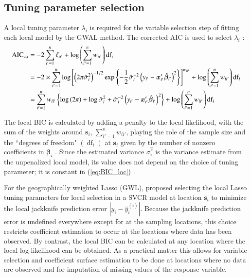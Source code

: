 \documentclass[authoryear, review, 11pt]{elsarticle}
\DeclareMathOperator*{\df}{\mbox{df}}
\begin{document}
	\subsection{Tuning parameter selection}	
	A local tuning parameter $\lambda_i$ is required for the variable selection step of fitting each local model by the GWAL method. The corrected AIC is used to select $\lambda_i$ \citep{Hurvich:1998}:
	\begin{align}\label{eq:BIC_loc}
		\mbox{AIC}_{\text{c}, i} &= -2 \sum_{i'=1}^n \ell_{ii'}  + \log \left( \sum_{i'=1}^n w_{ii'} \right) \mbox{df}_i\notag\\
		&= -2 \times \sum_{i'=1}^n \log \left[ \left(2 \pi \hat{\sigma}_i^2\right)^{-1/2} \exp \left\{-\frac{1}{2} \hat{\sigma}_i^{-2} \left(y_{i'} - \bm{x}_{i'}' \hat{\bm{\beta}}_{i'} \right)^2\right\} \right]^{w_{ii'}} + \log \left( \sum_{i'=1}^n w_{ii'} \right) \mbox{df}_i\notag\\
		&= \sum_{i'=1}^n w_{ii'} \left\{ \log \left(2 \pi \right) + \log \hat{\sigma}_i^2 + \hat{\sigma}_i^{-2} \left(y_{i'} - \bm{x}_{i'}' \hat{\bm{\beta}}_{i'} \right)^2 \right\} + \log \left( \sum_{i'=1}^n w_{ii'} \right) \mbox{df}_i
	\end{align}
	
	 The local BIC is calculated by adding a penalty to the local likelihood, with the sum of the weights around $\bm{s}_i$, $\sum_{i'=1}^n w_{ii'}$, playing the role of the sample size and the ``degrees of freedom" $\left( \df_i \right)$ at $\bm{s}_i$ given by the number of nonzero coefficients in $\bm{\beta}_i$ \citep{Zou:2007}. Since the estimated variance $\hat{\sigma}_i^2$ is the variance estimate from the unpenalized local model, its value does not depend on the choice of tuning parameter; it is constant in (\ref{eq:BIC_loc}) \citep{Zou:2007}.
	
	For the geographically weighted Lasso (GWL), \cite{Wheeler:2009} proposed selecting the local Lasso tuning parameters for local selection in a SVCR model at location $\bm{s}_i$ to minimize the local jackknife prediction error $|y_i - \hat{y}_i^{(i)}|$. Because the jackknife prediction error is undefined everywhere except for at the sampling locations, this choice restricts coefficient estimation to occur at the locations where data has been observed. By contrast, the local BIC can be calculated at any location where the local log-likelihood can be obtained. As a practical matter this allows for variable selection and coefficient surface estimation to be done at locations where no data are observed and for imputation of missing values of the response variable.
	
\end{document}
